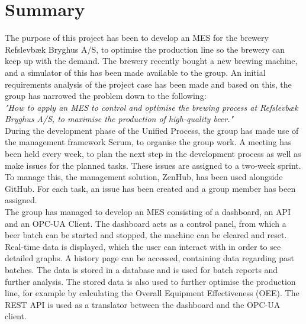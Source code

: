 \section{Summary}
The purpose of this project has been to develop an MES for the brewery
Refslevbæk Bryghus A/S, to optimise the production line so the brewery
can keep up with the demand. The brewery recently bought a new brewing machine,
and a simulator of this has been made available to the group. An initial
requirements analysis of the project case has been made and based on this, the
group has narrowed the problem down to the following:\\

\textit{"How to apply an MES to control and optimise the brewing process at
Refslevbæk Bryghus A/S, to maximise the production of high-quality beer."}\\

During the development phase of the Unified Process, the group has made use of
the management framework Scrum, to organise the group work. A meeting has been
held every week, to plan the next step in the development process as well as
make issues for the planned tasks. These issues are assigned to a two-week
sprint. To manage this, the management solution, ZenHub, has been used alongside
GitHub. For each task, an issue has been created and a group member has been
assigned. \\

The group has managed to develop an MES consisting of a dashboard, an API and an
OPC-UA Client. The dashboard acts as a control panel, from which a beer batch
can be started and stopped, the machine can be cleared and reset. Real-time data
is displayed, which the user can interact with in order to see detailed graphs.
A history page can be accessed, containing data regarding past batches. The data
is stored in a database and is used for batch reports and further analysis. The
stored data is also used to further optimise the production line, for example by
calculating the Overall Equipment Effectiveness (OEE). The REST API is used as a
translator between the dashboard and the OPC-UA client.